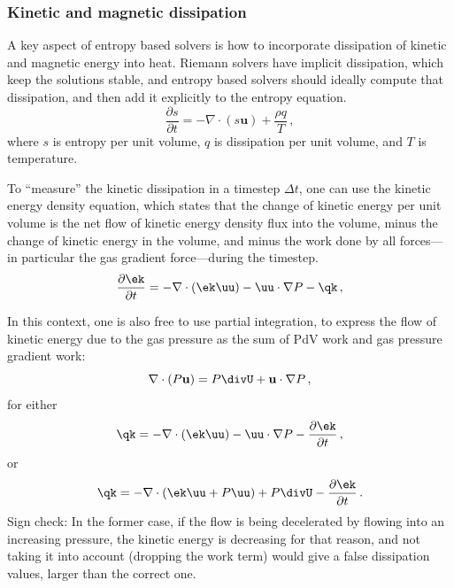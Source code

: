 \documentclass[paper=a4,fontsize=11pt]{scrartcl}
\numberwithin{equation}{section}		%
\numberwithin{figure}{section}			%
\numberwithin{table}{section}				%
\begin{document}
\subsubsection{Kinetic and magnetic dissipation}
A key aspect of entropy based solvers is how to incorporate dissipation of kinetic and magnetic energy into heat. Riemann solvers have implicit dissipation, which keep the solutions stable, and entropy based solvers should ideally compute that dissipation, and then add it explicitly to the entropy equation.
\begin{equation}
    \frac{\partial s}{\partial t} = - \nabla\cdot (s\mathbf{u}) + \frac{\rho q}{T}  \,,
\end{equation}
where $s$ is entropy per unit volume, $q$ is dissipation per unit volume, and $T$ is temperature.

To ``measure'' the kinetic dissipation in a timestep $\Delta t$, one can use the kinetic energy density equation, which states that the change of kinetic energy per unit volume is the net flow of kinetic energy density flux into the volume, minus the change of kinetic energy in the volume, and minus the work done by all forces---in particular the gas gradient force---during the timestep.
\begin{equation}
    \frac{\partial \ek}{\partial t} =  - \nabla \cdot (\ek \uu) - \uu \cdot \nabla P - \qk\,,
\end{equation}

In this context, one is also free to use partial integration, to express the flow of kinetic energy due to the gas pressure as the sum of PdV work and gas pressure gradient work:
\begin{equation}
   \nabla\cdot (P\mathbf{u}) = P \divU + \mathbf{u}\cdot\nabla P \,,
\end{equation}
for either
\begin{equation}
     \qk = - \nabla \cdot (\ek \uu) - \uu \cdot \nabla P - \frac{\partial \ek}{\partial t}\,,
\end{equation}
or
\begin{equation}
     \qk = - \nabla \cdot (\ek \uu + P\uu) + P \divU - \frac{\partial \ek}{\partial t}\,.
\end{equation}
Sign check:  In the former case, if the flow is being decelerated by flowing into an increasing pressure, the kinetic energy is decreasing for that reason, and not taking it into account (dropping the work term) would give a false dissipation values, larger than the correct one. 
\end{document}
